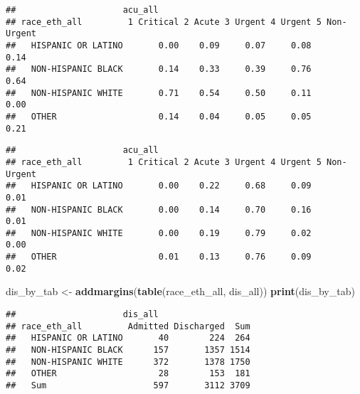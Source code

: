 \documentclass[]{article}
\newenvironment{Shaded}{\begin{snugshade}}{\end{snugshade}}
\newcommand{\KeywordTok}[1]{\textcolor[rgb]{0.13,0.29,0.53}{\textbf{#1}}}
\newcommand{\DataTypeTok}[1]{\textcolor[rgb]{0.13,0.29,0.53}{#1}}
\newcommand{\DecValTok}[1]{\textcolor[rgb]{0.00,0.00,0.81}{#1}}
\newcommand{\StringTok}[1]{\textcolor[rgb]{0.31,0.60,0.02}{#1}}
\newcommand{\OperatorTok}[1]{\textcolor[rgb]{0.81,0.36,0.00}{\textbf{#1}}}
\newcommand{\NormalTok}[1]{#1}
\begin{document}
\begin{verbatim}
##                     acu_all
## race_eth_all         1 Critical 2 Acute 3 Urgent 4 Urgent 5 Non-Urgent
##   HISPANIC OR LATINO       0.00    0.09     0.07     0.08         0.14
##   NON-HISPANIC BLACK       0.14    0.33     0.39     0.76         0.64
##   NON-HISPANIC WHITE       0.71    0.54     0.50     0.11         0.00
##   OTHER                    0.14    0.04     0.05     0.05         0.21
\end{verbatim}

\begin{Shaded}
\end{Shaded}

\begin{verbatim}
##                     acu_all
## race_eth_all         1 Critical 2 Acute 3 Urgent 4 Urgent 5 Non-Urgent
##   HISPANIC OR LATINO       0.00    0.22     0.68     0.09         0.01
##   NON-HISPANIC BLACK       0.00    0.14     0.70     0.16         0.01
##   NON-HISPANIC WHITE       0.00    0.19     0.79     0.02         0.00
##   OTHER                    0.01    0.13     0.76     0.09         0.02
\end{verbatim}

\begin{Shaded}
\begin{Highlighting}[]
\NormalTok{dis_by_tab <-}\StringTok{ }\KeywordTok{addmargins}\NormalTok{(}\KeywordTok{table}\NormalTok{(race_eth_all, dis_all))}
\KeywordTok{print}\NormalTok{(dis_by_tab)}
\end{Highlighting}
\end{Shaded}

\begin{verbatim}
##                     dis_all
## race_eth_all         Admitted Discharged  Sum
##   HISPANIC OR LATINO       40        224  264
##   NON-HISPANIC BLACK      157       1357 1514
##   NON-HISPANIC WHITE      372       1378 1750
##   OTHER                    28        153  181
##   Sum                     597       3112 3709
\end{verbatim}

\begin{Shaded}
\end{Shaded}
\end{document}
